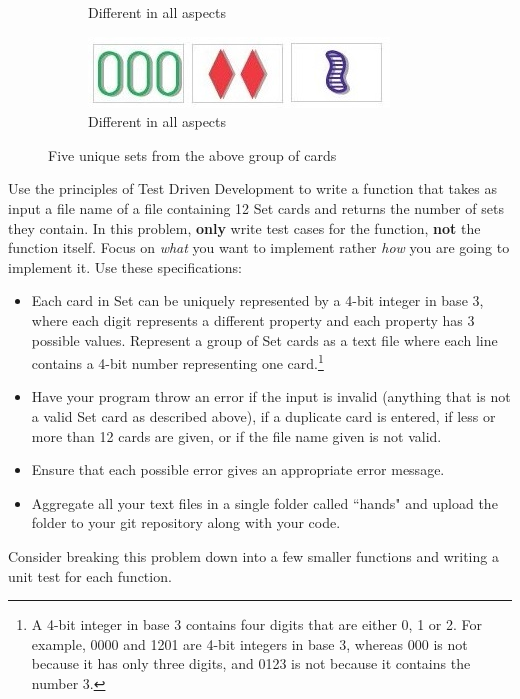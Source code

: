 \begin{problem}
\begin{figure}[H]
\begin{subfigure}{.47\textwidth}
    \caption{Different in all aspects}
    \label{fig:labeltheotherfigure}
\end{subfigure}
\begin{subfigure}{.47\textwidth}
    \centering
    \includegraphics[width=\linewidth]{figures/set5.jpg}
    \caption{Different in all aspects}
    \label{fig:labeltheotherfigure}
\end{subfigure}
\caption{Five unique sets from the above group of cards}
\end{figure}

\vspace{5mm}

Use the principles of Test Driven Development to write a function that takes as input a file name of a file containing 12 Set cards and returns the number of sets they contain. In this problem, \textbf{only} write test cases for the function, \textbf{not} the function itself. Focus on \emph{what} you want to implement rather \emph{how} you are going to implement it. Use these specifications:
\begin{itemize}
\item Each card in Set can be uniquely represented by a 4-bit integer in base 3, where each digit represents a different property and each property has 3 possible values. Represent a group of Set cards as a text file where each line contains a 4-bit number representing one card.\footnote{A 4-bit integer in base 3 contains four digits that are either 0, 1 or 2. For example, 0000 and 1201 are 4-bit integers in base 3, whereas 000 is not because it has only three digits, and 0123 is not because it contains the number 3.}

\item Have your program throw an error if the input is invalid (anything that is not a valid Set card as described above),  if a duplicate card is entered, if less or more than 12 cards are given, or if the file name given is not valid.
\item Ensure that each possible error gives an appropriate error message.
\item Aggregate all your text files in a single folder called ``hands" and upload the folder to your git repository along with your code.
\end{itemize}

Consider breaking this problem down into a few smaller functions and writing a unit test for each function.

\end{problem}

